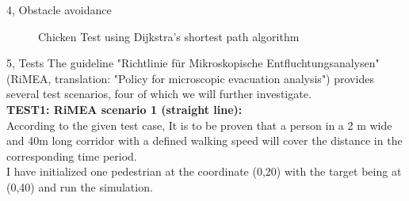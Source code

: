 \documentclass[10pt,a4paper]{article}
\begin{document}
\begin{task}{4, Obstacle avoidance}
\begin{figure}[H]
    
    \caption{Chicken Test using Dijkstra's shortest path algorithm}
    \label{fig:dij_chick}
\end{figure}





\end{task}








\begin{task}{5, Tests}
The guideline "Richtlinie für Mikroskopische Entfluchtungsanalysen" (RiMEA, translation: "Policy
for microscopic evacuation analysis") provides several test scenarios, four of which we will further investigate. \\ 

\textbf{TEST1: RiMEA scenario 1 (straight line):}\\ According to the given test case, It is to be proven that a person in a 2 m wide and 40m long corridor with a defined walking speed will
cover the distance in the corresponding time period.\\
I have initialized one pedestrian at the coordinate (0,20) with the target being at (0,40) and run the simulation.


\end{task}
\end{document}
